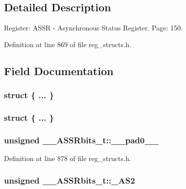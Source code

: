 \subsection{Detailed Description}
Register\+: A\+S\+S\+R -\/ Asynchronous Status Register. Page\+: 150. 

Definition at line 869 of file reg\+\_\+structs.\+h.



\subsection{Field Documentation}
\hypertarget{union_____a_s_s_rbits__t_a4218556b71e2608307ae20b074fcd912}{\subsubsection[{"@213}]{\setlength{\rightskip}{0pt plus 5cm}struct \{ ... \} }}\label{union_____a_s_s_rbits__t_a4218556b71e2608307ae20b074fcd912}
\hypertarget{union_____a_s_s_rbits__t_aeb66c814c4d1bb4630944ce1d452d990}{\subsubsection[{"@215}]{\setlength{\rightskip}{0pt plus 5cm}struct \{ ... \} }}\label{union_____a_s_s_rbits__t_aeb66c814c4d1bb4630944ce1d452d990}
\hypertarget{union_____a_s_s_rbits__t_aa0e3502d39d4b4b4f780012e7605d6d4}{
\subsubsection[{\+\_\+\+\_\+pad0\+\_\+\+\_\+}]{\setlength{\rightskip}{0pt plus 5cm}unsigned \+\_\+\+\_\+\+A\+S\+S\+Rbits\+\_\+t\+::\+\_\+\+\_\+pad0\+\_\+\+\_\+}}\label{union_____a_s_s_rbits__t_aa0e3502d39d4b4b4f780012e7605d6d4}


Definition at line 878 of file reg\+\_\+structs.\+h.

\hypertarget{union_____a_s_s_rbits__t_a5fc5ff00b5ce1cbddd1db1268521a44d}{
\subsubsection[{\+\_\+\+A\+S2}]{\setlength{\rightskip}{0pt plus 5cm}unsigned \+\_\+\+\_\+\+A\+S\+S\+Rbits\+\_\+t\+::\+\_\+\+A\+S2}}\label{union_____a_s_s_rbits__t_a5fc5ff00b5ce1cbddd1db1268521a44d}


